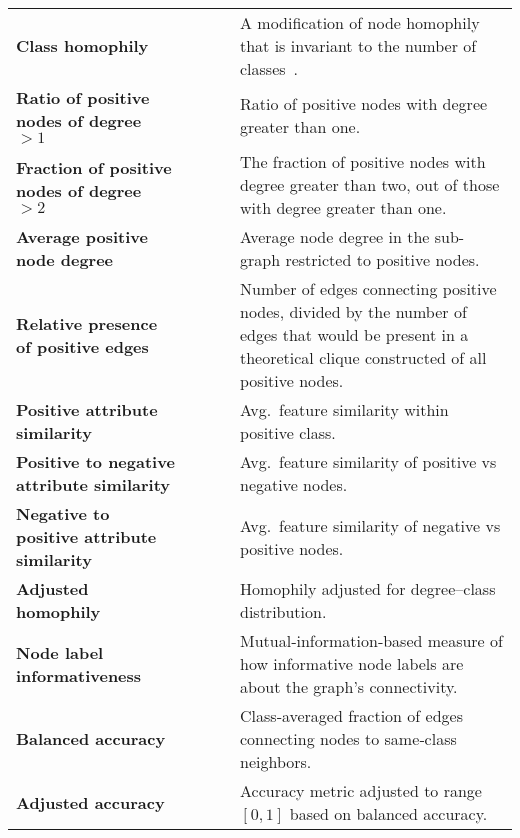 \begin{table*}
\begin{tabularx}{\linewidth}{XcccX}
		\textbf{Class homophily}                           & \checkmark    & \checkmark         & \crossmark          & A modification of node homophily that is invariant to the number of classes~\cite{lim_large_2021}. \\
		\textbf{Ratio of positive nodes of degree $>1$}    & \checkmark    & \checkmark         & \crossmark          & Ratio of positive nodes with degree greater than one. \\
		\textbf{Fraction of positive nodes of degree $>2$} & \checkmark    & \checkmark         & \crossmark          & The fraction of positive nodes with degree greater than two, out of those with degree greater than one. \\
		\textbf{Average positive node degree}              & \checkmark    & \checkmark         & \crossmark          & Average node degree in the sub-graph restricted to positive nodes. \\
		\textbf{Relative presence of positive edges}       & \checkmark    & \checkmark         & \crossmark          & Number of edges connecting positive nodes, divided by the number of edges that would be present in a theoretical clique constructed of all positive nodes. \\
		\textbf{Positive attribute similarity}             & \checkmark    & \crossmark         & \checkmark          & Avg.\ feature similarity within positive class. \\
		\textbf{Positive to negative attribute similarity} & \checkmark    & \crossmark         & \checkmark          & Avg.\ feature similarity of positive vs negative nodes. \\
		\textbf{Negative to positive attribute similarity} & \checkmark    & \crossmark         & \checkmark          & Avg.\ feature similarity of negative vs positive nodes. \\
		\textbf{Adjusted homophily}                        & \checkmark    & \checkmark         & \crossmark          & Homophily adjusted for degree–class distribution. \\
		\textbf{Node label informativeness}                & \checkmark    & \checkmark         & \crossmark          & Mutual‐information‐based measure of how informative node labels are about the graph’s connectivity. \\
		\textbf{Balanced accuracy}                         & \checkmark    & \checkmark         & \crossmark          & Class‐averaged fraction of edges connecting nodes to same‐class neighbors. \\
		\textbf{Adjusted accuracy}                         & \checkmark    & \checkmark         & \crossmark          & Accuracy metric adjusted to range $[0,1]$ based on balanced accuracy. \\
		\bottomrule
	\end{tabularx}
\end{table*}
